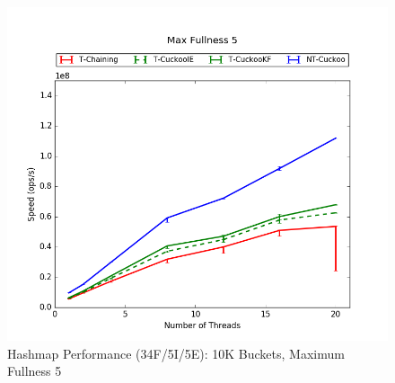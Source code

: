\begin{figure}[H]
    \centering
	\begin{minipage}{0.5\textwidth}\includegraphics[width=\textwidth]{maps/5HM10K:F90,I5,E5.png} 
    \end{minipage}
	\begin{minipage}{0.4\textwidth}
    
    \end{minipage}
    \caption{Hashmap Performance (34F/5I/5E): 10K Buckets, Maximum Fullness 5}
\end{figure}

